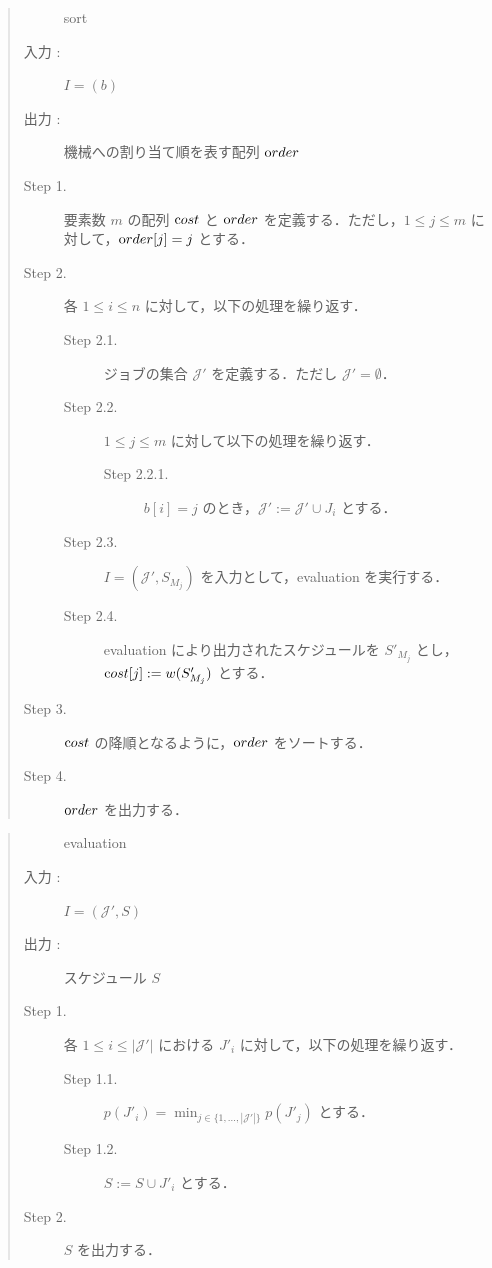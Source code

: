 \documentclass[12pt]{optlab-bachelor}
\begin{document}
\begin{quote}
  \begin{description}
    \item[] {\sc sort}
    \item[入力 :] $I = (b)$
    \item[出力 :] 機械への割り当て順を表す配列 ${\mbox order}$
  \end{description}
  \begin{description}
    \item[Step 1.] 要素数 $m$ の配列 ${\mbox cost}$ と ${\mbox order}$ を定義する．ただし，$1 \le j \le m $ に対して，${\mbox order}[j] = j$ とする．
    \item[Step 2.] 各 $1 \le i \le n$ に対して，以下の処理を繰り返す．
    \begin{description}
      \item[Step 2.1.] ジョブの集合 $\mathcal{J}'$ を定義する．ただし $\mathcal{J}' = \emptyset$．
      \item[Step 2.2.] $1 \le j \le m$ に対して以下の処理を繰り返す．
      \begin{description}
        \item[Step 2.2.1.] $b[i] = j$ のとき，$\mathcal{J}' :=\mathcal{J}' \cup J_i$ とする．
      \end{description}
      \item[Step 2.3.] $I = (\mathcal{J}',S_{M_j})$ を入力として，{\sc evaluation} を実行する．
      \item[Step 2.4.] {\sc evaluation} により出力されたスケジュールを $S'_{M_j}$ とし，\\${\mbox cost}[j] := w(S'_{M_j})$ とする．
    \end{description}
    \item[Step 3.] ${\mbox cost}$ の降順となるように，${\mbox order}$ をソートする．
    \item[Step 4.] ${\mbox order}$ を出力する．
  \end{description}
\end{quote}

\begin{quote}
  \begin{description}
    \item[] {\sc evaluation}
    \item[入力 :] $I = (\mathcal{J'},S)$
    \item[出力 :] スケジュール $S$
  \end{description}
  \begin{description}
    \item[Step 1.] 各 $1 \le i \le |\mathcal{J}'|$ における $J'_i$ に対して，以下の処理を繰り返す．
    \begin{description}
      \item[Step 1.1.] $p(J'_i) = \displaystyle \min_{j \in \{1,\ldots,|\mathcal{J}'|\}}p(J'_j)$ とする．
      \item[Step 1.2.] $S := S \cup J'_i$ とする．
    \end{description}
    \item[Step 2.] $S$ を出力する．
  \end{description}
\end{quote}
\end{document}
